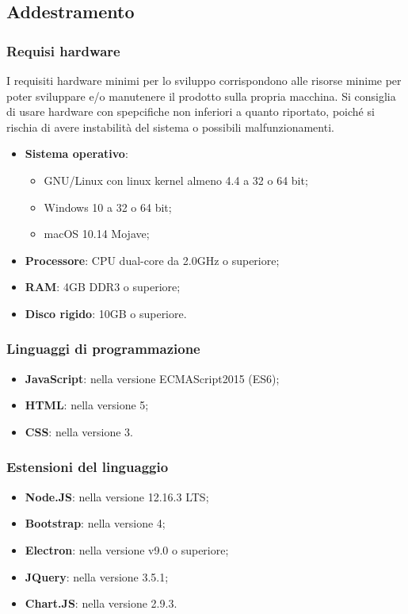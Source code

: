 \documentclass[../manuale-sviluppatore.tex]{subfiles}
\begin{document}
\subsection{Addestramento}%
\label{subs:addestramento}

\subsubsection{Requisi hardware}
I requisiti hardware minimi per lo sviluppo corrispondono alle risorse minime per poter sviluppare e/o manutenere il prodotto sulla propria macchina. Si consiglia di usare hardware con spepcifiche non inferiori a quanto riportato, poiché si rischia di avere instabilità del sistema o possibili malfunzionamenti.
\begin{itemize}
  \item \textbf{Sistema operativo}:
  \begin{itemize}
    \item GNU/Linux con linux kernel almeno 4.4 a 32 o 64 bit;
    \item Windows 10 a 32 o 64 bit;
    \item macOS 10.14 Mojave;
  \end{itemize}
  \item \textbf{Processore}: CPU dual-core da 2.0GHz o superiore;
  \item \textbf{RAM}: 4GB DDR3 o superiore;
  \item \textbf{Disco rigido}: 10GB o superiore.
\end{itemize}

\subsubsection{Linguaggi di programmazione}
\begin{itemize}
  \item \textbf{JavaScript}: nella versione ECMAScript2015 (ES6);
  \item \textbf{HTML}: nella versione 5;
  \item \textbf{CSS}: nella versione 3.
\end{itemize}

\subsubsection{Estensioni del linguaggio}
\begin{itemize}
  \item \textbf{Node.JS}: nella versione 12.16.3 LTS;
  \item \textbf{Bootstrap}: nella versione 4;
  \item \textbf{Electron}: nella versione v9.0 o superiore;
  \item \textbf{JQuery}: nella versione 3.5.1;
  \item \textbf{Chart.JS}: nella versione 2.9.3.
\end{itemize}
\end{document}
